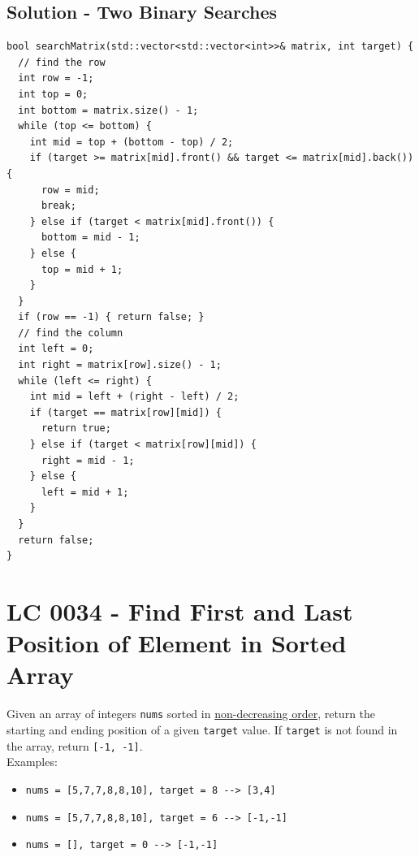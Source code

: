 \subsection*{Solution - Two Binary Searches}
\begin{lstlisting}
bool searchMatrix(std::vector<std::vector<int>>& matrix, int target) {
  // find the row
  int row = -1;
  int top = 0;
  int bottom = matrix.size() - 1;
  while (top <= bottom) {
    int mid = top + (bottom - top) / 2;
    if (target >= matrix[mid].front() && target <= matrix[mid].back()) {
      row = mid;
      break;
    } else if (target < matrix[mid].front()) {
      bottom = mid - 1;
    } else {
      top = mid + 1;
    }
  }
  if (row == -1) { return false; }
  // find the column
  int left = 0;
  int right = matrix[row].size() - 1;
  while (left <= right) {
    int mid = left + (right - left) / 2;
    if (target == matrix[row][mid]) {
      return true;
    } else if (target < matrix[row][mid]) {
      right = mid - 1;
    } else {
      left = mid + 1;
    }
  }
  return false;
}
\end{lstlisting}

\section{LC 0034 - Find First and Last Position of Element in Sorted Array}
Given an array of integers {\colorbox{CodeBackground}{\lstinline|nums|}} sorted in \ul{non-decreasing order}, return the starting and ending position of a given {\colorbox{CodeBackground}{\lstinline|target|}} value. If {\colorbox{CodeBackground}{\lstinline|target|}} is not found in the array, return {\colorbox{CodeBackground}{\lstinline|[-1, -1]|}}.\\

Examples:
\begin{itemize}
	\item {\colorbox{CodeBackground}{\lstinline|nums = [5,7,7,8,8,10], target = 8 --> [3,4]|}}
	\item {\colorbox{CodeBackground}{\lstinline|nums = [5,7,7,8,8,10], target = 6 --> [-1,-1]|}}
	\item {\colorbox{CodeBackground}{\lstinline|nums = [], target = 0 --> [-1,-1]|}}
\end{itemize}

